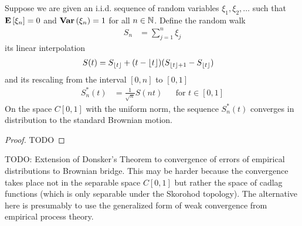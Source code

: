 \begin{thm}
Suppose we are given an i.i.d. sequence of random variables $\xi_1,
\xi_2, \dotsc$ such that $\textbf{E}\left[\xi_n\right]=0$ and
$\textbf{Var} \left (\xi_n \right )=1$ for all $n \in \mathbb{N}$.  Define the random
walk 
\begin{align*}
S_n &= \sum_{j=1}^n \xi_j
\end{align*}
its linear interpolation
\begin{align*}
S(t) &= S_{\lfloor t \rfloor} + (t - \lfloor t \rfloor)(S_{\lfloor t \rfloor+1} - S_{\lfloor t \rfloor})
\end{align*}
and its rescaling from the interval $[0,n]$ to $[0,1]$
\begin{align*}
S_n^*(t) &= \frac{1}{\sqrt{n}} S(nt) & & \text{for $t\in [0,1]$}
\end{align*}
On the space $C[0,1]$ with the uniform norm, the sequence $S^*_n(t)$
converges in distribution to the standard Brownian motion.
\end{thm}

\begin{proof}
TODO
\end{proof}

TODO: Extension of Donsker's Theorem to convergence of errors of
empirical distributions to Brownian bridge.  This may be harder
because the convergence takes place not in the separable space
$C[0,1]$ but rather the space of cadlag functions (which is only
separable under the Skorohod topology).  The alternative here is
presumably to use the generalized form of weak convergence from
empirical process theory.